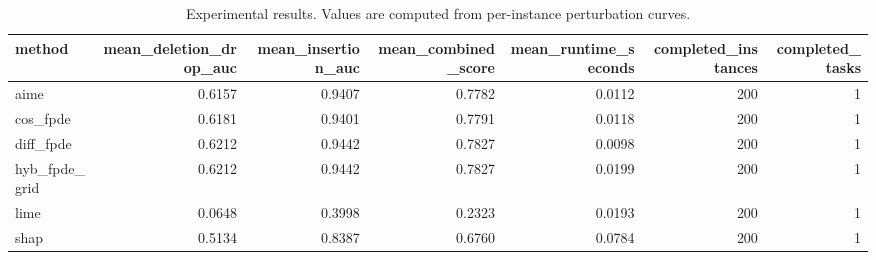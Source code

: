 \begin{table}[t]
\caption{Experimental results. Values are computed from per-instance perturbation curves.}
\label{tab:main_results_computed}
\centering
\begin{tabular}{lrrrrrr}
\toprule
method & mean\_deletion\_drop\_auc & mean\_insertion\_auc & mean\_combined\_score & mean\_runtime\_seconds & completed\_instances & completed\_tasks \\
\midrule
aime & 0.6157 & 0.9407 & 0.7782 & 0.0112 & 200 & 1 \\
cos\_fpde & 0.6181 & 0.9401 & 0.7791 & 0.0118 & 200 & 1 \\
diff\_fpde & 0.6212 & 0.9442 & 0.7827 & 0.0098 & 200 & 1 \\
hyb\_fpde\_grid & 0.6212 & 0.9442 & 0.7827 & 0.0199 & 200 & 1 \\
lime & 0.0648 & 0.3998 & 0.2323 & 0.0193 & 200 & 1 \\
shap & 0.5134 & 0.8387 & 0.6760 & 0.0784 & 200 & 1 \\
\bottomrule
\end{tabular}

\end{table}
